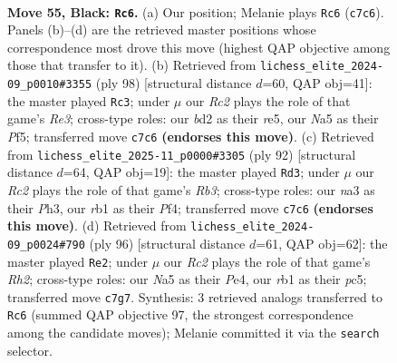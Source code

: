 \documentclass[11pt]{article}
\begin{document}
\clearpage

\begin{figure}[p]\centering
\begin{subfigure}{0.46\textwidth}\centering
\resizebox{\linewidth}{!}{%
\newchessgame
\chessboard[
  setfen={7r/p1r5/1p2p1kp/n7/2P1P3/N2K4/P2B2PR/1R6 b - - 4 55},
  showmover=false,
  pgfstyle=straightmove, color=movearrow, markmove={c7-c6}
]}
\caption{}
\end{subfigure}\hfill
\begin{subfigure}{0.46\textwidth}\centering
\resizebox{\linewidth}{!}{%
\newchessgame
\chessboard[
  setfen={8/6k1/2p2n2/p3rPNp/P3p2P/1P2R1P1/6K1/8 w - - 3 50},
  showmover=false,
  pgfstyle=straightmove, color=movearrow, markmove={e3-c3}
]}
\caption{}
\end{subfigure}
\\[4pt]
\begin{subfigure}{0.46\textwidth}\centering
\resizebox{\linewidth}{!}{%
\newchessgame
\chessboard[
  setfen={1r3k2/5np1/BP5p/p2bPp2/1pN2P2/1R4PP/8/4K3 w - - 6 47},
  showmover=false,
  pgfstyle=straightmove, color=movearrow, markmove={b3-d3}
]}
\caption{}
\end{subfigure}\hfill
\begin{subfigure}{0.46\textwidth}\centering
\resizebox{\linewidth}{!}{%
\newchessgame
\chessboard[
  setfen={8/p5k1/1p4b1/2pPr1pp/2P1P3/3K4/P6R/6R1 w - - 1 49},
  showmover=false,
  pgfstyle=straightmove, color=movearrow, markmove={h2-e2}
]}
\caption{}
\end{subfigure}
\caption{\textbf{Move 55, Black: \texttt{Rc6}.} (a) Our position; Melanie plays \texttt{Rc6} (\texttt{c7c6}). Panels (b)--(d) are the retrieved master positions whose correspondence most drove this move (highest QAP objective among those that transfer to it). (b) Retrieved from \texttt{lichess\_elite\_2024-09\_p0010\#3355} (ply 98) [structural distance $d$=60, QAP obj=41]: the master played \texttt{Rc3}; under $\mu$ our \emph{Rc2} plays the role of that game's \emph{Re3}; cross-type roles: our \emph{b}d2 as their \emph{r}e5, our \emph{N}a5 as their \emph{P}f5; transferred move \texttt{c7c6} \textbf{(endorses this move)}. (c) Retrieved from \texttt{lichess\_elite\_2025-11\_p0000\#3305} (ply 92) [structural distance $d$=64, QAP obj=19]: the master played \texttt{Rd3}; under $\mu$ our \emph{Rc2} plays the role of that game's \emph{Rb3}; cross-type roles: our \emph{n}a3 as their \emph{P}h3, our \emph{r}b1 as their \emph{P}f4; transferred move \texttt{c7c6} \textbf{(endorses this move)}. (d) Retrieved from \texttt{lichess\_elite\_2024-09\_p0024\#790} (ply 96) [structural distance $d$=61, QAP obj=62]: the master played \texttt{Re2}; under $\mu$ our \emph{Rc2} plays the role of that game's \emph{Rh2}; cross-type roles: our \emph{N}a5 as their \emph{P}e4, our \emph{r}b1 as their \emph{p}c5; transferred move \texttt{c7g7}. Synthesis: 3 retrieved analogs transferred to \texttt{Rc6} (summed QAP objective 97, the strongest correspondence among the candidate moves); Melanie committed it via the \texttt{search} selector.}
\label{fig:thought-m109}
\end{figure}
\end{document}
